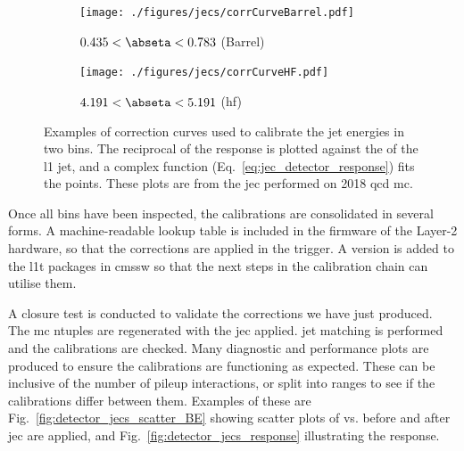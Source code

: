 
\begin{figure}[htbp]
    \centering
    \begin{subfigure}[b]{0.45\textwidth}
        \texttt{[image: ./figures/jecs/corrCurveBarrel.pdf]}
        \caption{$0.435 < \abseta < 0.783$ (Barrel)}
        \label{fig:detector_jecs_corr_curve_Barrel}
    \end{subfigure}
    \hfill
    \begin{subfigure}[b]{0.45\textwidth}
        \texttt{[image: ./figures/jecs/corrCurveHF.pdf]}
        \caption{$4.191 < \abseta < 5.191$ (\acrshort{hf})}
        \label{fig:detector_jecs_corr_curve_HF}
    \end{subfigure}
\caption[Examples of correction curves used to calibrate the jet energies in two \abseta bins]{Examples of correction curves used to calibrate the \gls{jet} energies in two \abseta bins. The reciprocal of the response is plotted against the \pt of the \acrlong{l1} \gls{jet}, and a complex function (Eq.~\ref{eq:jec_detector_response}) fits the points. These plots are from the \acrlong{jec} performed on 2018 \acrshort{qcd} \acrlong{mc}.}
\label{fig:detector_jecs_corr_curves}
\end{figure}

Once all \abseta bins have been inspected, the calibrations are consolidated in several forms. A machine-readable lookup table is included in the firmware of the Layer-2 hardware, so that the corrections are applied in the trigger. A version is added to the \acrlong{l1t} packages in \acrshort{cmssw} so that the next steps in the calibration chain can utilise them.

A closure test is conducted to validate the corrections we have just produced. The \acrshort{mc} ntuples are regenerated with the \acrshort{jec} applied. \Gls{jet} matching is performed and the calibrations are checked. Many diagnostic and performance plots are produced to ensure the calibrations are functioning as expected. These can be inclusive of the number of \gls{pileup} interactions, or split into ranges to see if the calibrations differ between them. Examples of these are Fig.~\ref{fig:detector_jecs_scatter_BE} showing scatter plots of \ptRef vs. \ptLOne before and after \acrshort{jec} are applied, and Fig.~\ref{fig:detector_jecs_response} illustrating the response.

